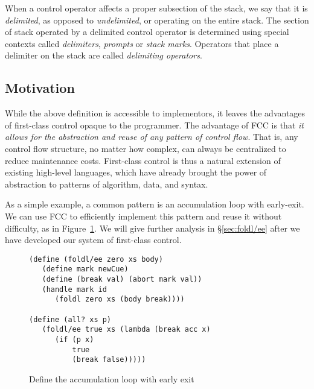 \documentclass[11pt]{article}
\newcommand{\maybePage}{\newpage}
\begin{document}
When a control operator affects a proper subsection of the stack, we say that it is \emph{delimited}, as opposed to \emph{undelimited}, or operating on the entire stack.
The section of stack operated by a delimited control operator is determined using special contexts called \emph{delimiters}, \emph{prompts} or \emph{stack marks}.
Operators that place a delimiter on the stack are called \emph{delimiting operators}.


\maybePage
\subsection{Motivation}

While the above definition is accessible to implementors, it leaves the advantages of first-class control opaque to the programmer.
The advantage of FCC is that \emph{it allows for the abstraction and reuse of any pattern of control flow}.
That is, any control flow structure, no matter how complex, can always be centralized to reduce maintenance costs.
First-class control is thus a natural extension of existing high-level languages, which have already brought the power of abstraction to patterns of algorithm, data, and syntax.

As a simple example, a common pattern is an accumulation loop with early-exit.
We can use FCC to efficiently implement this pattern and reuse it without difficulty, as in Figure~\ref{fig:ex-foldl/ee}.
We will give further analysis in \S\ref{sec:foldl/ee} after we have developed our system of first-class control.

\begin{figure}[H]
\caption{Define the accumulation loop with early exit}
\label{fig:ex-foldl/ee}
\begin{verbatim}
(define (foldl/ee zero xs body)
   (define mark newCue)
   (define (break val) (abort mark val))
   (handle mark id
      (foldl zero xs (body break))))

(define (all? xs p)
   (foldl/ee true xs (lambda (break acc x)
      (if (p x)
          true
          (break false)))))
\end{verbatim}
\end{figure}
\end{document}
